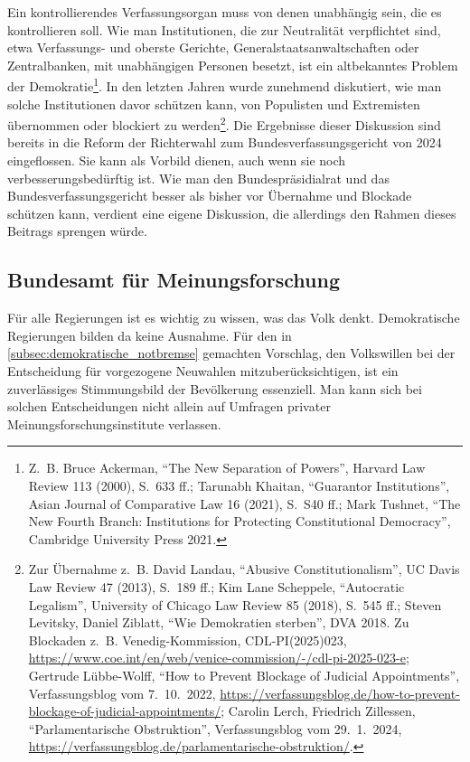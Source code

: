 Ein kontrollierendes Verfassungsorgan muss von denen unabhängig sein, die es kontrollieren soll.
Wie man Institutionen, die zur Neutralität verpflichtet sind, etwa Verfassungs- und oberste Gerichte, Generalstaatsanwaltschaften oder Zentralbanken, mit unabhängigen Personen besetzt, ist ein altbekanntes Problem der Demokratie\footnote{Z.~B. Bruce Ackerman, \enquote{The New Separation of Powers}, Harvard Law Review 113 (2000), S.~633 ff.; Tarunabh Khaitan, \enquote{Guarantor Institutions}, Asian Journal of Comparative Law 16 (2021), S.~S40 ff.; Mark Tushnet, \enquote{The New Fourth Branch: Institutions for Protecting Constitutional Democracy}, Cambridge University Press 2021.}.
In den letzten Jahren wurde zunehmend diskutiert, wie man solche Institutionen davor schützen kann, von Populisten und Extremisten übernommen oder blockiert zu werden\footnote{Zur Übernahme z.~B. David Landau, \enquote{Abusive Constitutionalism}, UC Davis Law Review 47 (2013), S.~189 ff.; Kim Lane Scheppele, \enquote{Autocratic Legalism}, University of Chicago Law Review 85 (2018), S.~545 ff.; Steven Levitsky, Daniel Ziblatt, \enquote{Wie Demokratien sterben}, DVA 2018.
Zu Blockaden z.~B. Venedig-Kommission, CDL-PI(2025)023, \url{https://www.coe.int/en/web/venice-commission/-/cdl-pi-2025-023-e}; Gertrude Lübbe-Wolff, \enquote{How to Prevent Blockage of Judicial Appointments}, Verfassungsblog vom 7.~10.~2022, \url{https://verfassungsblog.de/how-to-prevent-blockage-of-judicial-appointments/}; Carolin Lerch, Friedrich Zillessen, \enquote{Parlamentarische Obstruktion}, Verfassungsblog vom 29.~1.~2024, \url{https://verfassungsblog.de/parlamentarische-obstruktion/}.}.
Die Ergebnisse dieser Diskussion sind bereits in die Reform der Richterwahl zum Bundesverfassungsgericht von 2024 eingeflossen.
Sie kann als Vorbild dienen, auch wenn sie noch verbesserungsbedürftig ist.
Wie man den Bundespräsidialrat und das Bundesverfassungsgericht besser als bisher vor Übernahme und Blockade schützen kann, verdient eine eigene Diskussion, die allerdings den Rahmen dieses Beitrags sprengen würde.

\subsection{Bundesamt für Meinungsforschung}\label{subsec:bundesamt_fuer_meinungsforschung}

Für alle Regierungen ist es wichtig zu wissen, was das Volk denkt.
Demokratische Regierungen bilden da keine Ausnahme.
Für den in \cref{subsec:demokratische_notbremse} gemachten Vorschlag, den Volkswillen bei der Entscheidung für vorgezogene Neuwahlen mitzuberücksichtigen,
ist ein zuverlässiges Stimmungsbild der Bevölkerung essenziell.
Man kann sich bei solchen Entscheidungen nicht allein auf Umfragen privater Meinungsforschungsinstitute verlassen.

